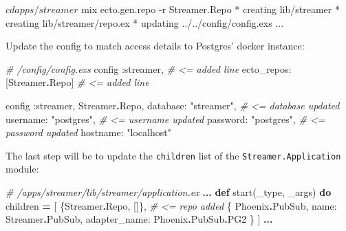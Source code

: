 \documentclass[
]{book}
\newenvironment{Shaded}{\begin{snugshade}}{\end{snugshade}}
\newcommand{\AttributeTok}[1]{\textcolor[rgb]{0.77,0.63,0.00}{#1}}
\newcommand{\CommentTok}[1]{\textcolor[rgb]{0.56,0.35,0.01}{\textit{#1}}}
\newcommand{\ConstantTok}[1]{\textcolor[rgb]{0.00,0.00,0.00}{#1}}
\newcommand{\ExtensionTok}[1]{#1}
\newcommand{\KeywordTok}[1]{\textcolor[rgb]{0.13,0.29,0.53}{\textbf{#1}}}
\newcommand{\NormalTok}[1]{#1}
\newcommand{\OperatorTok}[1]{\textcolor[rgb]{0.81,0.36,0.00}{\textbf{#1}}}
\newcommand{\StringTok}[1]{\textcolor[rgb]{0.31,0.60,0.02}{#1}}
\newcommand{\VariableTok}[1]{\textcolor[rgb]{0.00,0.00,0.00}{#1}}
\begin{document}
\begin{Shaded}
\begin{Highlighting}[]
\ExtensionTok{$}\NormalTok{ cd apps/streamer}
\ExtensionTok{$}\NormalTok{ mix ecto.gen.repo }\AttributeTok{{-}r}\NormalTok{ Streamer.Repo}
\ExtensionTok{*}\NormalTok{ creating lib/streamer}
\ExtensionTok{*}\NormalTok{ creating lib/streamer/repo.ex}
\ExtensionTok{*}\NormalTok{ updating ../../config/config.exs}
\ExtensionTok{...}
\end{Highlighting}
\end{Shaded}

Update the config to match access details to Postgres' docker instance:

\begin{Shaded}
\begin{Highlighting}[]
\CommentTok{\# /config/config.exs}
\NormalTok{config }\VariableTok{:streamer}\NormalTok{,             }\CommentTok{\# \textless{}= added line }
  \VariableTok{ecto\_repos:}\NormalTok{ [}\ConstantTok{Streamer}\OperatorTok{.}\ConstantTok{Repo}\NormalTok{] }\CommentTok{\# \textless{}= added line}

\NormalTok{config }\VariableTok{:streamer}\NormalTok{, }\ConstantTok{Streamer}\OperatorTok{.}\ConstantTok{Repo}\NormalTok{,}
  \VariableTok{database:} \StringTok{"streamer"}\NormalTok{, }\CommentTok{\# \textless{}= database updated }
  \VariableTok{username:} \StringTok{"postgres"}\NormalTok{, }\CommentTok{\# \textless{}= username updated}
  \VariableTok{password:} \StringTok{"postgres"}\NormalTok{, }\CommentTok{\# \textless{}= password updated}
  \VariableTok{hostname:} \StringTok{"localhost"}
\end{Highlighting}
\end{Shaded}

The last step will be to update the \texttt{children} list of the \texttt{Streamer.Application} module:

\begin{Shaded}
\begin{Highlighting}[]
\CommentTok{\# /apps/streamer/lib/streamer/application.ex}
\OperatorTok{...}
  \KeywordTok{def}\NormalTok{ start(\_type, \_args) }\KeywordTok{do}
\NormalTok{    children }\OperatorTok{=}\NormalTok{ [}
\NormalTok{      \{}\ConstantTok{Streamer}\OperatorTok{.}\ConstantTok{Repo}\NormalTok{, []\}, }\CommentTok{\# \textless{}= repo added}
\NormalTok{      \{}
        \ConstantTok{Phoenix}\OperatorTok{.}\ConstantTok{PubSub}\NormalTok{,}
        \VariableTok{name:} \ConstantTok{Streamer}\OperatorTok{.}\ConstantTok{PubSub}\NormalTok{, }\VariableTok{adapter\_name:} \ConstantTok{Phoenix}\OperatorTok{.}\ConstantTok{PubSub}\OperatorTok{.}\ConstantTok{PG2}
\NormalTok{      \}}
\NormalTok{    ]}
    \OperatorTok{...}
\end{Highlighting}
\end{Shaded}
\end{document}
